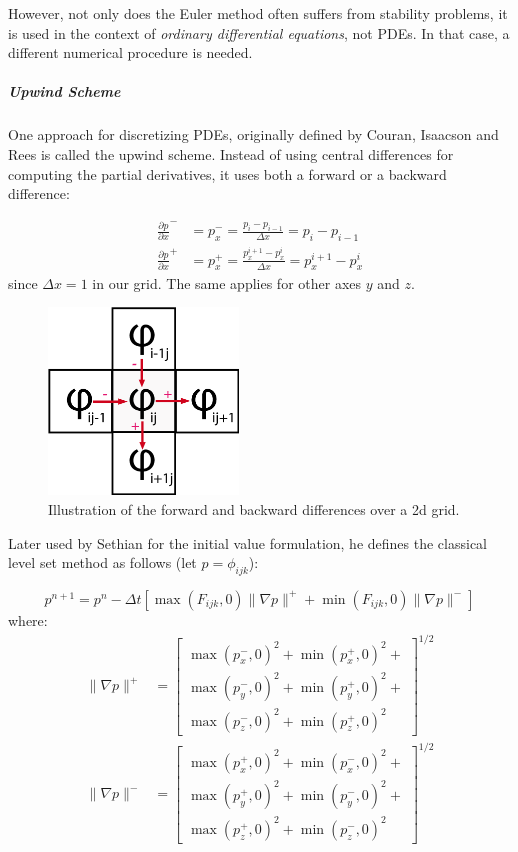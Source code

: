 \documentclass{article}
\begin{document}
However, not only does the Euler method often suffers from stability problems,
it is used in the context of \textit{ordinary differential equations}, not PDEs.
In that case, a different numerical procedure is needed. 

\subparagraph{Upwind Scheme}
One approach for discretizing PDEs, originally defined by Couran, Isaacson and
Rees \cite{courant1952solution} is called the upwind scheme. Instead of using
central differences for computing the partial derivatives, it uses both a
forward or a backward difference:

\begin{align}
    \frac{\partial p}{\partial x}^{-} &= p^{-}_x = \frac{p_i -
    p_{i-1}}{ \Delta x} = p_i - p_{i-1} \\
    \frac{\partial p}{\partial x}^{+} &= p^{+}_x = \frac{p^{i+1}_x -
    p^i_x}{ \Delta x} = p^{i+1}_x - p^i_x  
\end{align} since $ \Delta x = 1 $ in our grid. The same applies for other axes
$y$ and $z$.

\begin{figure}[htb]
  \centering
  \includegraphics[width=0.45\textwidth]{img/upwind_grid.png}
  \caption{Illustration of the forward and backward differences over a 2d grid.}    
\end{figure}


Later used by Sethian\cite{sethian1999level} \cite{sethian1999advancing} for
the initial value formulation, he defines the classical level set method as
follows (let $ p = \phi_{ijk}$):

\[
p^{n+1} = p^{n} - \Delta t [ \max(F_{ijk}, 0) \| \nabla p \|^{+} + \min(F_{ijk},
0) \| \nabla p \|^{-} ]
\]
where:
\begin{align}
    \| \nabla p \|^{+} & = 
    \begin{bmatrix}
        \max(p^{-}_x, 0)^2 + \min(p^{+}_x, 0)^2 + \\
        \max(p^{-}_y, 0)^2 + \min(p^{+}_y, 0)^2 + \\
        \max(p^{-}_z, 0)^2 + \min(p^{+}_z, 0)^2
    \end{bmatrix}^{1/2}  \\
    \| \nabla p \|^{-} & = 
    \begin{bmatrix}
        \max(p^{+}_x, 0)^2 + \min(p^{-}_x, 0)^2 + \\
        \max(p^{+}_y, 0)^2 + \min(p^{-}_y, 0)^2 + \\
        \max(p^{+}_z, 0)^2 + \min(p^{-}_z, 0)^2
    \end{bmatrix}^{1/2} 
\end{align}
\end{document}
